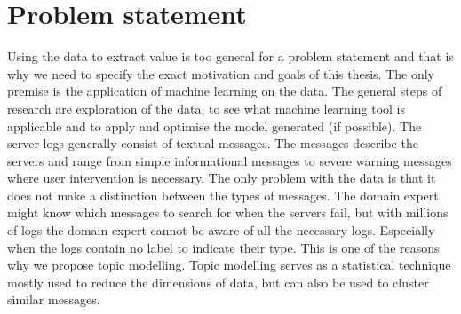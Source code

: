\begin{comment}
--todo--
The intention of this research started with analysing e system logs to help create a model for predicting hardware and software failure for maintenance and automatic self-healing. The huge amount of system logs available from a variety of systems brought the question how to analyse and make use of the logs to predict hardware and software failure.

Current research of big data makes this a suitable problem to solve through recent machine learning techniques. 
During the time spent on this research challenges were met and identified for realising this goal and ended with the usage of Natural Language Processing (NLP) and unsupervised learning.  The untapped amount of raw data makes it possible for many more application, but in further paragraphs it will be made clear why NLP was chosen and what more could be applied on this Big data problem.

\end{comment}
 
\section{Problem statement}\label{introduction:Motivation}
Using the data to extract value is too general for a problem statement and that is why we need to specify the exact motivation and goals of this thesis. The only premise is the application of machine learning on the data. The general steps of research are exploration of the data, to see what machine learning tool is applicable and to apply and optimise the model generated (if possible). The server logs generally consist of textual messages. The messages describe the servers and range from simple informational messages to severe warning messages where user intervention is necessary. The only problem with the data is that it does not make a distinction between the types of messages. The domain expert might know which messages to search for when the servers fail, but with millions of logs the domain expert cannot be aware of all the necessary logs. Especially when the logs contain no label to indicate their type. This is one of the reasons why we propose topic modelling. Topic modelling serves as a statistical technique mostly used to reduce the dimensions of data, but can also be used to cluster similar messages.

